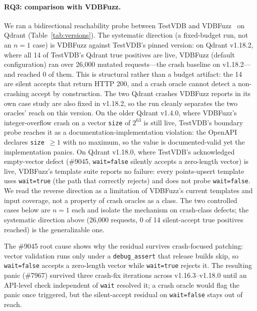 \documentclass[sigconf]{acmart}
\begin{document}
\paragraph{RQ3: comparison with VDBFuzz.}
We ran a bidirectional reachability probe between TestVDB and VDBFuzz~\cite{vdbfuzz26} on Qdrant (Table~\ref{tab:versions}). The systematic direction (a fixed-budget run, not an $n{=}1$ case) is VDBFuzz against TestVDB's pinned version: on Qdrant v1.18.2, where all 14 of TestVDB's Qdrant true positives are live, VDBFuzz (default configuration) ran over 26{,}000 mutated requests---the crash baseline on v1.18.2---and reached 0 of them. This is structural rather than a budget artifact: the 14 are silent accepts that return HTTP 200, and a crash oracle cannot detect a non-crashing accept by construction. The two Qdrant crashes VDBFuzz reports in its own case study are also fixed in v1.18.2, so the run cleanly separates the two oracles' reach on this version. On the older Qdrant v1.4.0, where VDBFuzz's integer-overflow crash on a vector \texttt{size} of $2^{63}$ is still live, TestVDB's boundary probe reaches it as a documentation-implementation violation: the OpenAPI declares \texttt{size}~$\geq 1$ with no maximum, so the value is documented-valid yet the implementation panics. On Qdrant v1.18.0, where TestVDB's acknowledged empty-vector defect (\#9045, \texttt{wait=false} silently accepts a zero-length vector) is live, VDBFuzz's template suite reports no failure: every points-upsert template uses \texttt{wait=true} (the path that correctly rejects) and does not probe \texttt{wait=false}. We read the reverse direction as a limitation of VDBFuzz's current templates and input coverage, not a property of crash oracles as a class. The two controlled cases below are $n{=}1$ each and isolate the mechanism on crash-class defects; the systematic direction above (26{,}000 requests, 0 of 14 silent-accept true positives reached) is the generalizable one.

The \#9045 root cause shows why the residual survives crash-focused patching: vector validation runs only under a \texttt{debug\_assert} that release builds skip, so \texttt{wait=false} accepts a zero-length vector while \texttt{wait=true} rejects it. The resulting panic (\#7967) survived three crash-fix iterations across v1.16.3--v1.18.0 until an API-level check independent of \texttt{wait} resolved it; a crash oracle would flag the panic once triggered, but the silent-accept residual on \texttt{wait=false} stays out of reach.
\end{document}
